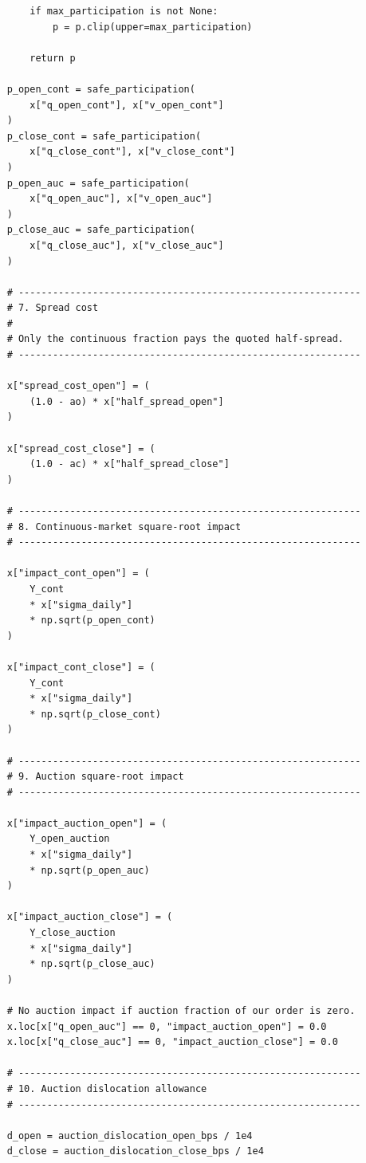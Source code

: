 \begin{verbatim}
        if max_participation is not None:
            p = p.clip(upper=max_participation)

        return p

    p_open_cont = safe_participation(
        x["q_open_cont"], x["v_open_cont"]
    )
    p_close_cont = safe_participation(
        x["q_close_cont"], x["v_close_cont"]
    )
    p_open_auc = safe_participation(
        x["q_open_auc"], x["v_open_auc"]
    )
    p_close_auc = safe_participation(
        x["q_close_auc"], x["v_close_auc"]
    )

    # ------------------------------------------------------------
    # 7. Spread cost
    #
    # Only the continuous fraction pays the quoted half-spread.
    # ------------------------------------------------------------

    x["spread_cost_open"] = (
        (1.0 - ao) * x["half_spread_open"]
    )

    x["spread_cost_close"] = (
        (1.0 - ac) * x["half_spread_close"]
    )

    # ------------------------------------------------------------
    # 8. Continuous-market square-root impact
    # ------------------------------------------------------------

    x["impact_cont_open"] = (
        Y_cont
        * x["sigma_daily"]
        * np.sqrt(p_open_cont)
    )

    x["impact_cont_close"] = (
        Y_cont
        * x["sigma_daily"]
        * np.sqrt(p_close_cont)
    )

    # ------------------------------------------------------------
    # 9. Auction square-root impact
    # ------------------------------------------------------------

    x["impact_auction_open"] = (
        Y_open_auction
        * x["sigma_daily"]
        * np.sqrt(p_open_auc)
    )

    x["impact_auction_close"] = (
        Y_close_auction
        * x["sigma_daily"]
        * np.sqrt(p_close_auc)
    )

    # No auction impact if auction fraction of our order is zero.
    x.loc[x["q_open_auc"] == 0, "impact_auction_open"] = 0.0
    x.loc[x["q_close_auc"] == 0, "impact_auction_close"] = 0.0

    # ------------------------------------------------------------
    # 10. Auction dislocation allowance
    # ------------------------------------------------------------

    d_open = auction_dislocation_open_bps / 1e4
    d_close = auction_dislocation_close_bps / 1e4


\end{verbatim}
